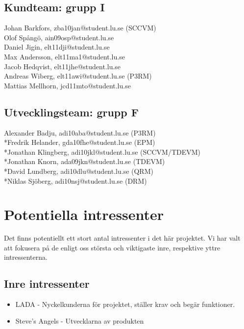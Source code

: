 \documentclass[10pt]{article}
\begin{document}
\subsection{Kundteam: grupp I}
\noindent
Johan Barkfors, zba10jan@student.lu.se (SCCVM)
\\Olof Spångö, ain09osp@student.lu.se
\\Daniel Jigin, elt11dji@student.lu.se
\\Max Andersson, elt11ma1@student.lu.se
\\Jacob Hedqvist, elt11jhe@student.lu.se
\\Andreas Wiberg, elt11awi@student.lu.se (P3RM)
\\Mattias Mellhorn, jcd11mto@student.lu.se


\subsection{Utvecklingsteam: grupp F}
\noindent
Alexander Badju, adi10aba@student.lu.se (P3RM)	
\\*Fredrik Helander, gda10fhe@student.lu.se (EPM)
\\*Jonathan Klingberg, adi10jkl@student.lu.se (SCCVM/TDEVM)
\\*Jonathan Knorn, ada09jkn@student.lu.se (TDEVM)
\\*David Lundberg, adi10dlu@student.lu.se (QRM)
\\*Niklas Sjöberg, adi10nsj@student.lu.se (DRM)

\section{Potentiella intressenter}
\sloppy
\noindent
Det finns potentiellt ett stort antal intressenter i det här projektet. Vi har valt att fokusera på de enligt oss största och viktigaste inre, respektive yttre intressenterna.

\subsection{Inre intressenter}
\noindent
\begin{itemize}
	\setlength\itemsep{0.1em}
	\item LADA - Nyckelkunderna för projektet, ställer krav och begär funktioner.
	\item Steve’s Angels - Utvecklarna av produkten
\end{itemize}
\end{document}
